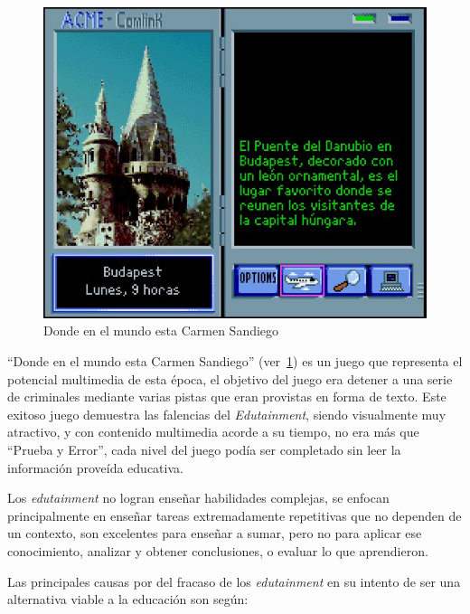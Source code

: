 \begin{figure}[ht!] 
\centering 
\includegraphics[scale=0.5]{tics/images/carmen.jpg}
\caption{Donde en el mundo esta Carmen Sandiego} 
\label{fig:carmen}
\end{figure}

\enquote{Donde en el mundo esta Carmen Sandiego} (ver~\ref{fig:carmen}) es un
juego que representa el potencial multimedia de esta época, el objetivo del
juego era detener a una serie de criminales mediante varias pistas que eran
provistas en forma de texto. Este exitoso juego demuestra las falencias del
\textit{Edutainment}, siendo visualmente muy atractivo, y con contenido
multimedia acorde a su tiempo, no era más que \enquote{Prueba y Error}, cada
nivel del juego podía ser completado sin leer la información proveída
educativa\cite{charsky:2010}.

Los \emph{edutainment} no logran enseñar habilidades complejas, se enfocan
principalmente en enseñar tareas extremadamente repetitivas que no dependen de
un contexto\cite{charsky:2010,egenfeldt2007third,bruckman1999can}, son
excelentes para enseñar a sumar, pero no para aplicar ese conocimiento, analizar
y obtener conclusiones, o evaluar lo que aprendieron.

Las principales causas por del fracaso de los \emph{edutainment} en su intento
de ser una alternativa viable a la educación son según\cite{egenfeldt2007third}: 

